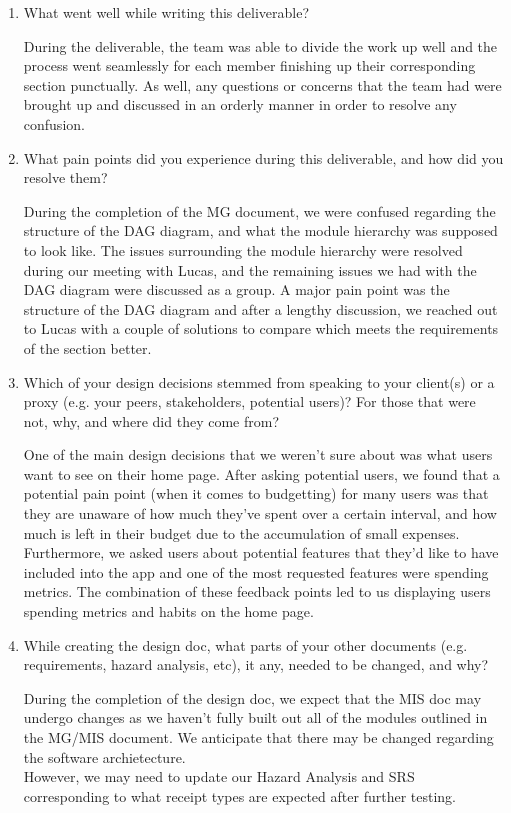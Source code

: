 \documentclass[12pt, titlepage]{article}
\begin{document}
\begin{enumerate}
  \item What went well while writing this deliverable? 

  During the deliverable, the team was able to divide the work up well and the process went seamlessly for each member finishing up their corresponding section punctually. 
  As well, any questions or concerns that the team had were brought up and discussed in an orderly manner in order to resolve any confusion. 

  \item What pain points did you experience during this deliverable, and how
    did you resolve them?

    During the completion of the MG document, we were confused regarding the structure of the DAG diagram, and what the module hierarchy was supposed to look like. The issues surrounding the module
    hierarchy were resolved during our meeting with Lucas, and the remaining issues we had with the DAG diagram were discussed as a group. A major pain point was the structure of the DAG diagram
    and after a lengthy discussion, we reached out to Lucas with a couple of solutions to compare which meets the requirements of the section better.

  \item Which of your design decisions stemmed from speaking to your client(s)
  or a proxy (e.g. your peers, stakeholders, potential users)? For those that
  were not, why, and where did they come from?

  One of the main design decisions that we weren't sure about was what users want to see on their home page. After asking potential users, we found that a potential pain point (when it comes to 
  budgetting) for many users was that they are unaware of how much they've spent over a certain interval, and how much is left in their budget due to the accumulation of small expenses. 
  Furthermore, we asked users about potential features that they'd like to have included into the app and one of the most requested features were spending metrics. The combination of these feedback
  points led to us displaying users spending metrics and habits on the home page. 

  \item While creating the design doc, what parts of your other documents (e.g.
  requirements, hazard analysis, etc), it any, needed to be changed, and why?

  During the completion of the design doc, we expect that the MIS doc may undergo changes as we haven't fully built out all of the modules outlined in the MG/MIS document. We anticipate that there
  may be changed regarding the software archietecture.\\
  However, we may need to update our Hazard Analysis and SRS corresponding to what receipt types are expected after further testing.


\end{enumerate}
\end{document}
